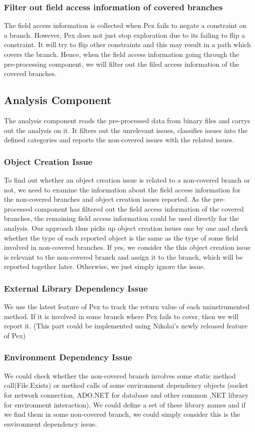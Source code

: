\subsubsection{Filter out field access information of covered branches}
The field access information is collected when Pex fails to negate a constraint on a branch. However, Pex does not just stop exploration due to its failing to flip a constraint. It will try to flip other constraints and this may result in a path which covers the branch. Hence, when the field access information going through the pre-processing component, we will filter out the filed access information of the covered branches.
\subsection{Analysis Component}
The analysis component reads the pre-processed data from binary files and carrys out the analysis on it. It filters out the unrelevant issues, classifies issues into the defined categories and reports the non-covered issues with the related issues. 
\subsubsection{Object Creation Issue}
To find out whether an object creation issue is related to a non-covered branch or not, we need to examine the information about the field access information for the non-covered branches and object creation issues reported. As the pre-processed component has filtered out the field access information of the covered branches, the remaining field access information could be used directly for the analysis. Our approach thus picks up object creation issues one by one and check whether the type of each reported object is the same as the type of some field involved in non-covered branches. If yes, we consider the this object creation issue is relevant to the non-covered branch and assign it to the branch, which will be reported together later. Otherwise, we just simply ignore the issue.
\subsubsection{External Library Dependency Issue}
We use the latest feature of Pex to track the return value of each uninstrumented method. If it is involved in some branch where Pex fails to cover, then we will report it. (This part could be implemented using Nikolai's newly released feature of Pex)
\subsubsection{Environment Dependency Issue}
We could check whether the non-covered branch involves some static method call(File.Exists) or method calls of some environment dependency objects (socket for network connection, ADO.NET for database and other common .NET library for environment interaction). We could define a set of these library names and if we find them in some non-covered branch, we could simply consider this is the environment dependency issue.
